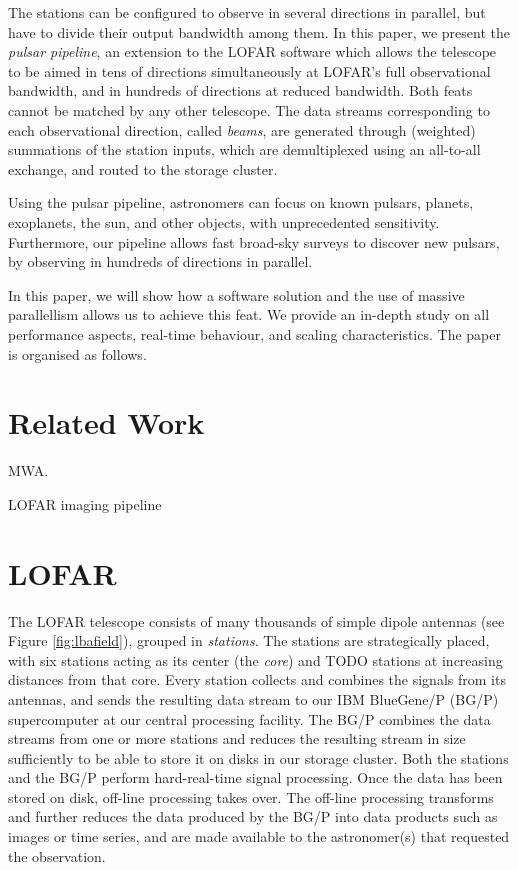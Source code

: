 \documentclass{llncs}
\begin{document}
The stations can be configured to observe in several directions in parallel, but have to divide their output bandwidth among them. In this paper, we present the \emph{pulsar pipeline}, an extension to the LOFAR software which allows the telescope to be aimed in tens of directions simultaneously at LOFAR's full observational bandwidth, and in hundreds of directions at reduced bandwidth. Both feats cannot be matched by any other telescope. The data streams corresponding to each observational direction, called \emph{beams}, are generated through (weighted) summations of the station inputs, which are demultiplexed using an all-to-all exchange, and routed to the storage cluster.

Using the pulsar pipeline, astronomers can focus on known pulsars, planets, exoplanets, the sun, and other objects, with unprecedented sensitivity. Furthermore, our pipeline allows fast broad-sky surveys to discover new pulsars, by observing in hundreds of directions in parallel. 


In this paper, we will show how a software solution and the use of massive parallellism allows us to achieve this feat. We provide an in-depth study on all performance aspects, real-time behaviour, and scaling characteristics. The paper is organised as follows.

\section{Related Work}

MWA.

LOFAR imaging pipeline \cite{Romein:10a}

\section{LOFAR}
\label{Sec:LOFAR}

The LOFAR telescope consists of many thousands of simple dipole antennas (see Figure \ref{fig:lbafield}), grouped in \emph{stations}. The stations are strategically placed, with six stations acting as its center (the \emph{core}) and TODO stations at increasing distances from that core. Every station collects and combines the signals from its antennas, and sends the resulting data stream to our IBM BlueGene/P (BG/P) supercomputer at our central processing facility. The BG/P combines the data streams from one or more stations and reduces the resulting stream in size sufficiently to be able to store it on disks in our storage cluster. Both the stations and the BG/P perform hard-real-time signal processing. Once the data has been stored on disk, off-line processing takes over. The off-line processing transforms and further reduces the data produced by the BG/P into data products such as images or time series, and are made available to the astronomer(s) that requested the observation.
\end{document}
